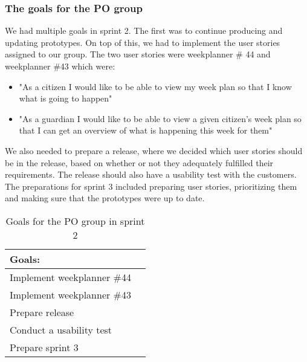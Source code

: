 \subsubsection{The goals for the PO group}
We had multiple goals in sprint 2.
The first was to continue producing and updating prototypes.
On top of this, we had to implement the user stories assigned to our group.
The two user stories were weekplanner \# 44 and weekplanner \#43 which were:
\begin{itemize}
 \item "As a citizen I would like to be able to view my week plan so that I know what is going to happen" 
 \item "As a guardian I would like to be able to view a given citizen's week plan so that I can get an overview of what is happening this week for them"
\end{itemize}
We also needed to prepare a release, where we decided which user stories should be in the release, based on whether or not they adequately fulfilled their requirements.
The release should also have a usability test with the customers.
The preparations for sprint 3 included preparing user stories, prioritizing them and making sure that the prototypes were up to date.
\begin{table}[H]
    \centering
    \begin{tabular}{|l|l|}
    \hline
    Goals:                                   \\ \hline
    Implement weekplanner \#44               \\ \hline
    Implement weekplanner \#43               \\ \hline
    Prepare release                          \\ \hline
    Conduct a usability test                   \\ \hline
    Prepare sprint 3                         \\ \hline
    \end{tabular}
    \caption{Goals for the PO group in sprint 2}
    \label{PO-goal-sprint-2}
\end{table}

